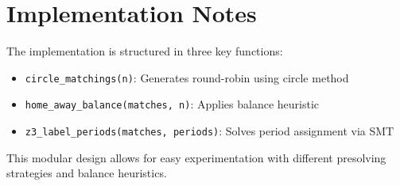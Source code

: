\documentclass{article}
\begin{document}
\section{Implementation Notes}

The implementation is structured in three key functions:
\begin{itemize}
    \item \texttt{circle\_matchings(n)}: Generates round-robin using circle method
    \item \texttt{home\_away\_balance(matches, n)}: Applies balance heuristic
    \item \texttt{z3\_label\_periods(matches, periods)}: Solves period assignment via SMT
\end{itemize}

This modular design allows for easy experimentation with different presolving strategies and balance heuristics.
\end{document}
